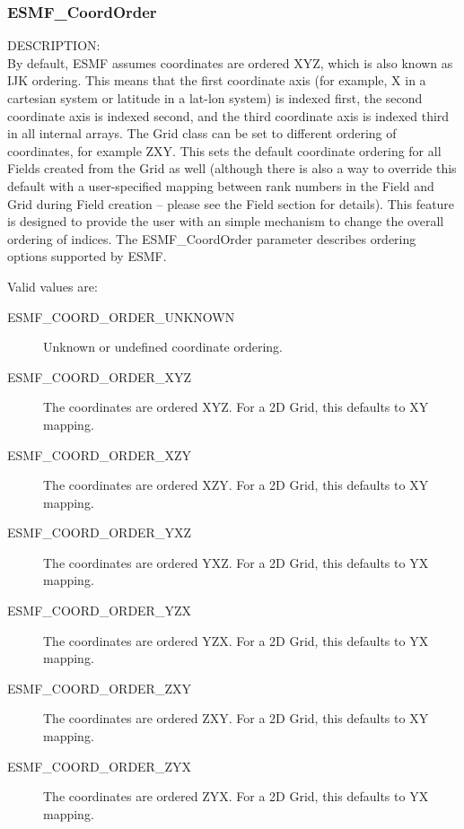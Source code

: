 

 \subsubsection{ESMF\_CoordOrder}

 {\sf DESCRIPTION:\\}
 By default, ESMF assumes coordinates are ordered XYZ, which is also known as
 IJK ordering.  This means that the first coordinate axis (for example, X in
 a cartesian system or latitude in a lat-lon system) is indexed first, the
 second coordinate axis is indexed second, and the third coordinate axis is
 indexed third in all internal arrays.  The Grid class can be set to different
 ordering of coordinates, for example ZXY.  This sets the default coordinate
 ordering for all Fields created from the Grid as well (although there is also
 a way to override this default with a user-specified mapping between rank
 numbers in the Field and Grid during Field creation -- please see the Field
 section for details).  This feature is designed to provide the user with an
 simple mechanism to change the overall ordering of indices.  The
 {ESMF\_CoordOrder} parameter describes ordering options supported by ESMF.

 Valid values are:
 \begin{description}
    \item [ESMF\_COORD\_ORDER\_UNKNOWN]
          Unknown or undefined coordinate ordering.

    \item [ESMF\_COORD\_ORDER\_XYZ]
          The coordinates are ordered XYZ.  For a 2D Grid, this defaults to
          XY mapping.

    \item [ESMF\_COORD\_ORDER\_XZY]
          The coordinates are ordered XZY.  For a 2D Grid, this defaults to
          XY mapping.

    \item [ESMF\_COORD\_ORDER\_YXZ]
          The coordinates are ordered YXZ.  For a 2D Grid, this defaults to
          YX mapping.

    \item [ESMF\_COORD\_ORDER\_YZX]
          The coordinates are ordered YZX.  For a 2D Grid, this defaults to
          YX mapping.

    \item [ESMF\_COORD\_ORDER\_ZXY]
          The coordinates are ordered ZXY.  For a 2D Grid, this defaults to
          XY mapping.

    \item [ESMF\_COORD\_ORDER\_ZYX]
          The coordinates are ordered ZYX.  For a 2D Grid, this defaults to
          YX mapping.
 
 \end{description}


